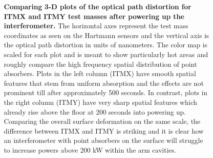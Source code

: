 \begin{figure}[t!]
	 	{\textbf{Comparing 3-D plots of the optical path distortion for ITMX and ITMY test masses after powering up the interferometer.}
	 		The horizontal axes represent the test mass coordinates as seen on the Hartmann sensors and the vertical axis is the optical path distortion in units of nanometers. The color map is scaled for each plot and is meant to show particularly hot areas and roughly compare the high frequency spatial distribution of point absorbers. Plots in the left column (ITMX) have smooth spatial features that stem from uniform absorption and the effects are not prominent till after approximately 500 seconds.  In contrast, plots in the right column (ITMY) have very sharp spatial features which already rise above the floor at 200 seconds into powering up.  Comparing the overall surface deformation on the same scale, the difference between ITMX and ITMY is striking and it is clear how an interferometer with point absorbers on the surface will struggle to increase powers above 200 kW within the arm cavities.
	 	}
	 	\label{fig:3d_HWS_plot}
	 \end{figure}

